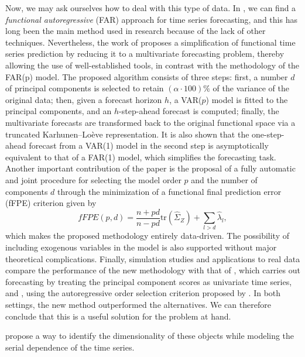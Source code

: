 \documentclass[
	12pt,				%
	oneside,			%
	a4paper,			%
	english,			%
	brazil				%
	]{abntex2ppgsi}
\begin{document}
Now, we may ask ourselves how to deal with this type of data. In , we can find a \textit{functional autoregressive} (FAR) approach for time series forecasting, and this has long been the main method used in research because of the lack of other techniques. Nevertheless, the work of  proposes a simplification of functional time series prediction by reducing it to a multivariate forecasting problem, thereby allowing the use of well-established tools, in contrast with the methodology of the FAR(p) model. The proposed algorithm consists of three steps: first, a number $d$ of principal components is selected to retain $(\alpha \cdot 100)\%$ of the variance of the original data; then, given a forecast horizon $h$, a VAR($p$) model is fitted to the principal components, and an $h$-step-ahead forecast is computed; finally, the multivariate forecasts are transformed back to the original functional space via a truncated Karhunen--Lo\`eve representation. It is also shown that the one-step-ahead forecast from a VAR(1) model in the second step is asymptotically equivalent to that of a FAR(1) model, which simplifies the forecasting task. Another important contribution of the paper is the proposal of a fully automatic and joint procedure for selecting the model order $p$ and the number of components $d$ through the minimization of a functional final prediction error (fFPE) criterion given by
\begin{equation}
 \textit{fFPE}(p,d)=\frac{n+pd}{n-pd}\mathrm{tr}(\hat{\Sigma}_{Z})+\sum_{l>d}\hat{\lambda}_{l},
\end{equation}
which makes the proposed methodology entirely data-driven. The possibility of including exogenous variables in the model is also supported without major theoretical complications. Finally, simulation studies and applications to real data compare the performance of the new methodology with that of , which carries out forecasting by treating the principal component scores as univariate time series, and , using the autoregressive order selection criterion proposed by . In both settings, the new method outperformed the alternatives. We can therefore conclude that this is a useful solution for the problem at hand.

 propose a way to identify the dimensionality of these objects while modeling the serial dependence of the time series.
\end{document}

